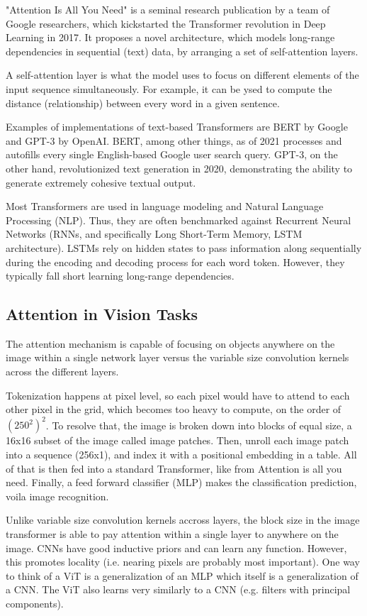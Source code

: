 "Attention Is All You Need" is a seminal research publication
by a team of Google researchers, which kickstarted the Transformer revolution in Deep Learning in 2017.
It proposes a novel architecture, which models long-range dependencies in
sequential (text) data, by arranging a set of self-attention layers. 

A self-attention layer is what the model uses to focus on different elements of the 
input sequence simultaneously. For example, it can be ysed to compute the 
distance (relationship) between every word in a given sentence. \citep{Attention}


Examples of implementations of text-based Transformers are BERT by Google and GPT-3 by OpenAI.
BERT, among other things, as of 2021 processes and autofills every single English-based 
Google user search query.
GPT-3, on the other hand, revolutionized text generation in 2020, demonstrating the ability 
to generate extremely cohesive textual output.

Most Transformers are used in language modeling and Natural Language Processing (NLP).
Thus, they are often benchmarked against Recurrent Neural Networks (RNNs, and specifically 
Long Short-Term Memory, LSTM architecture). LSTMs rely on hidden states to pass information 
along sequentially during the encoding and decoding process for each word token. 
However, they typically fall short learning long-range dependencies.


\subsection{Attention in Vision Tasks}

The attention mechanism is capable of focusing on objects anywhere on the image 
within a single network layer versus the variable size convolution kernels 
across the different layers.

Tokenization happens at pixel level, 
so each pixel would have to attend to each other pixel in the grid, which becomes 
too heavy to compute, on the order of $(250^2)^2$. To resolve that, the image is 
broken down into blocks of equal size, a 16x16 subset of the image called image patches. 
Then, unroll each image patch into a sequence (256x1), and index it with a positional 
embedding in a table. All of that is then fed into a standard Transformer, 
like from Attention is all you need. Finally, a feed forward classifier (MLP) 
makes the classification prediction, voila image recognition.

Unlike variable size convolution kernels accross 
layers, the block size in the image transformer is able to pay attention within 
a single layer to anywhere on the image. 
CNNs have good inductive priors and can learn any function. 
However, this promotes locality (i.e. nearing pixels are probably most important).
One way to think of a ViT is a generalization of an MLP which itself is a 
generalization of a CNN. The ViT also learns very similarly to a CNN 
(e.g. filters with principal components).

